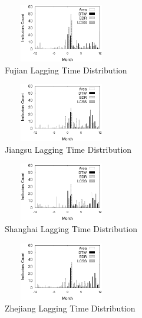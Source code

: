 \begin{figure}
	\centering
	\includegraphics[height=1in, width=2in]{fig/fujian_lag_dis}
	\caption{Fujian Lagging Time Distribution}
	\label{fig:fujian_lag}
\end{figure}

\begin{figure}
	\centering
	\includegraphics[height=1in, width=2in]{fig/jiangsu_lag_dis}
	\caption{Jiangsu Lagging Time Distribution}
	\label{fig:jiangsu_lag}
\end{figure}

\begin{figure}
	\centering
	\includegraphics[height=1in, width=2in]{fig/shanghai_lag_dis}
	\caption{Shanghai Lagging Time Distribution}
	\label{fig:shanghai_lag}
\end{figure}

\begin{figure}
	\centering
	\includegraphics[height=1in, width=2in]{fig/zhejiang_lag_dis}
	\caption{Zhejiang Lagging Time Distribution}
	\label{fig:zhejiang_lag}
\end{figure}